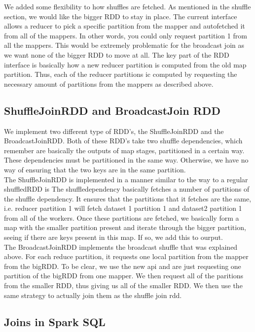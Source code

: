We added some flexibility to how shuffles are fetched. As mentioned in the shuffle section,
we would like the bigger RDD to stay in place. The current interface allows a reducer to pick a specific partition
from the mapper and autofetched it from all of the mappers. In other words, you could only request partition 1 from
all the mappers. This would be extremely problematic for the broadcast join as we want none of the bigger RDD to move
at all. The key part of the RDD interface is basically how a new reducer partition is computed from the old map partition.
Thus, each of the reducer partitions ic computed by requesting the necessary amount of partitions from the mappers as described above.   

\subsection{ShuffleJoinRDD and BroadcastJoin RDD}

We implement two different type of RDD's, the ShuffleJoinRDD and the
BroadcastJoinRDD. Both of these RDD's take two shuffle dependencies, which remember
are basically the outputs of map stages, partitioned in a certain way. These 
dependencies must be partitioned in the same way. Otherwise, we have no way
of ensuring that the two keys are in the same partition.  
\\

The ShuffleJoinRDD is implemented in a manner similar to the way to a regular shuffledRDD is  
The shuffledependency basically fetches a number of partitions of the shuffle dependency. 
It ensures that the partitions that it fetches are the same, i.e. reducer partition 1 will fetch dataset 1 partition 1 and dataset2
partition 1 from all of the workers. Once these partitions are fetched, we basically form a map with the smaller partition present
and iterate through the bigger partition, seeing if there are keys present in this map. If so, we add this to ourput.\\
The BroadcastJoinRDD implements the broadcast shuffle that was explained above.
For each reduce partition, it requests one local partition from the mapper from the bigRDD. To be clear,
we use the new api and are just requesting one partition of the bigRDD from one mapper. We then request 
all of the paritions from the smaller RDD, thus giving us all of the smaller RDD. We then use the same strategy
to actually join them as the shuffle join rdd.

\subsection{Joins in Spark SQL}

